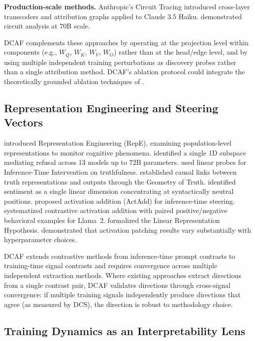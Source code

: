 \documentclass[11pt]{article}
\begin{document}
\textbf{Production-scale methods.} Anthropic's Circuit Tracing \citep{ameisen2025tracing,lindsey2025biology} introduced cross-layer transcoders and attribution graphs applied to Claude 3.5 Haiku. \citet{lieberum2023chinchilla} demonstrated circuit analysis at 70B scale.

DCAF complements these approaches by operating at the projection level within components (e.g., $W_Q$, $W_K$, $W_V$, $W_O$) rather than at the head/edge level, and by using multiple independent training perturbations as discovery probes rather than a single attribution method. DCAF's ablation protocol could integrate the theoretically grounded ablation techniques of \citet{li2024optimal}.

\subsection{Representation Engineering and Steering Vectors}

\citet{zou2023repe} introduced Representation Engineering (RepE), examining population-level representations to monitor cognitive phenomena. \citet{arditi2024refusal} identified a single 1D subspace mediating refusal across 13 models up to 72B parameters. \citet{li2023iti} used linear probes for Inference-Time Intervention on truthfulness. \citet{marks2024geometry} established causal links between truth representations and outputs through the Geometry of Truth. \citet{tigges2023sentiment} identified sentiment as a single linear dimension concentrating at syntactically neutral positions. \citet{turner2023actadd} proposed activation addition (ActAdd) for inference-time steering. \citet{panickssery2024caa} systematized contrastive activation addition with paired positive/negative behavioral examples for Llama~2. \citet{park2024linear} formalized the Linear Representation Hypothesis. \citet{zhang2024bestpractices} demonstrated that activation patching results vary substantially with hyperparameter choices.

DCAF extends contrastive methods from inference-time prompt contrasts to training-time signal contrasts and requires convergence across multiple independent extraction methods. Where existing approaches extract directions from a single contrast pair, DCAF validates directions through cross-signal convergence: if multiple training signals independently produce directions that agree (as measured by DCS), the direction is robust to methodology choice.

\subsection{Training Dynamics as an Interpretability Lens}
\end{document}
